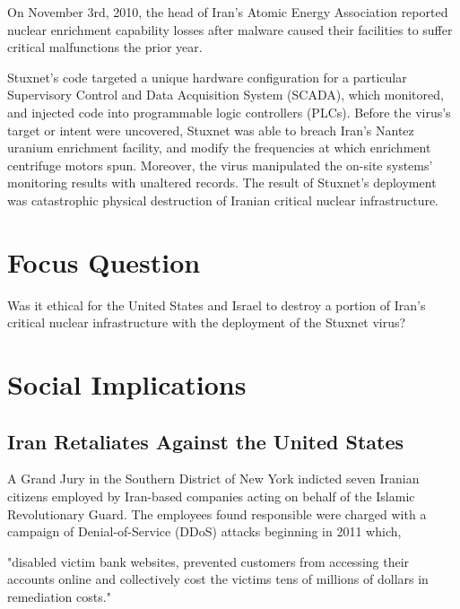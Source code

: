 \documentclass[12pt]{article}
\begin{document}
\begin{multicols}{2}
On November 3rd, 2010, the head of Iran's Atomic Energy Association reported nuclear enrichment capability losses after malware caused their facilities to suffer critical malfunctions the prior year.\cite{didStuxnetTakeOut1000Centrifuges} 

Stuxnet's code targeted a unique hardware configuration for a particular Supervisory Control and Data Acquisition System (SCADA), which monitored, and injected code into programmable logic controllers (PLCs). Before the virus's target or intent were uncovered, Stuxnet was able to breach Iran's Nantez uranium enrichment facility, and modify the frequencies at which enrichment centrifuge motors spun. Moreover, the virus manipulated the on-site systems' monitoring results with unaltered records. The result of Stuxnet's deployment was catastrophic physical destruction of Iranian critical nuclear infrastructure.\cite{w32.stuxnetDossier}\cite{lessonsFromStuxnet}

\section{Focus Question}

Was it ethical for the United States and Israel to destroy a portion of Iran's critical nuclear infrastructure with the deployment of the Stuxnet virus?

\section{Social Implications}

\subsection{Iran Retaliates Against the United States}
A Grand Jury in the Southern District of New York indicted seven Iranian citizens employed by Iran-based companies acting on behalf of the Islamic Revolutionary Guard.\cite{sevenIraniansIndicted} The employees found responsible were charged with a campaign of Denial-of-Service (DDoS) attacks beginning in 2011 which, 

\begin{displayquote}
"disabled victim bank websites, prevented customers from accessing their accounts online and collectively cost the victims tens of millions of dollars in remediation costs."\cite{sevenIraniansIndicted}
\end{displayquote}


\end{multicols}
\end{document}
